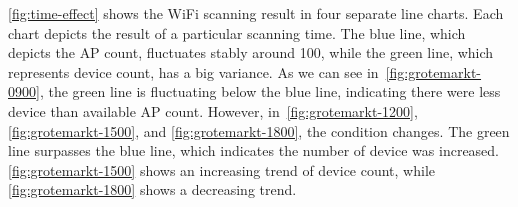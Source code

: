 	\autoref{fig:time-effect} shows the WiFi scanning result in four separate line charts. Each chart depicts the result of a particular scanning time. The blue line, which depicts the \ac{AP} count, fluctuates stably around 100, while the green line, which represents device count, has a big variance. As we can see in~\autoref{fig:grotemarkt-0900}, the green line is fluctuating below the blue line, indicating there were less device than available \ac{AP} count. However, in~\autoref{fig:grotemarkt-1200}, \autoref{fig:grotemarkt-1500}, and \autoref{fig:grotemarkt-1800}, the condition changes. The green line surpasses the blue line, which indicates the number of device was increased. \autoref{fig:grotemarkt-1500} shows an increasing trend of device count, while \autoref{fig:grotemarkt-1800} shows a decreasing trend.

	\begin{figure}[H]
		\centering
		\begin{adjustwidth}{-3cm}{}
\end{adjustwidth}
\end{figure}
